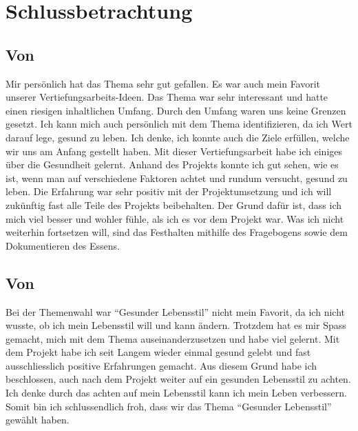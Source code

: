 \chapter{Schlussbetrachtung}
\section{Von \bastian}
\authortoc{\bastian}{\sectionident}
Mir persönlich hat das Thema sehr gut gefallen. Es war auch mein Favorit unserer Vertiefungsarbeits-Ideen. Das Thema war sehr interessant und hatte einen riesigen inhaltlichen Umfang. Durch den Umfang waren uns keine Grenzen gesetzt. Ich kann mich auch persönlich mit dem Thema identifizieren, da ich Wert darauf lege, gesund zu leben. Ich denke, ich konnte auch die Ziele erfüllen, welche wir uns am Anfang gestellt haben. Mit dieser Vertiefungsarbeit habe ich einiges über die Gesundheit gelernt. Anhand des Projekts konnte ich gut sehen, wie es ist, wenn man auf verschiedene Faktoren achtet und rundum versucht, gesund zu leben. Die Erfahrung war sehr positiv mit der Projektumsetzung und ich will zukünftig fast alle Teile des Projekts beibehalten. Der Grund dafür ist, dass ich mich viel besser und wohler fühle, als ich es vor dem Projekt war. Was ich nicht weiterhin fortsetzen will, sind das Festhalten mithilfe des Fragebogens sowie dem Dokumentieren des Essens. 
\section{Von \dario}
\authortoc{\dario}{\sectionident}
Bei der Themenwahl war “Gesunder Lebensstil” nicht mein Favorit, da ich nicht wusste, ob ich mein Lebensstil will und kann ändern. Trotzdem hat es mir Spass gemacht, mich mit dem Thema auseinanderzusetzen und habe viel gelernt. Mit dem Projekt habe ich seit Langem wieder einmal gesund gelebt und fast ausschliesslich positive Erfahrungen gemacht. Aus diesem Grund habe ich beschlossen, auch nach dem Projekt weiter auf ein gesunden Lebensstil zu achten. Ich denke durch das achten auf mein Lebensstil kann ich mein Leben verbessern. Somit bin ich schlussendlich froh, dass wir das Thema “Gesunder Lebensstil” gewählt haben.
